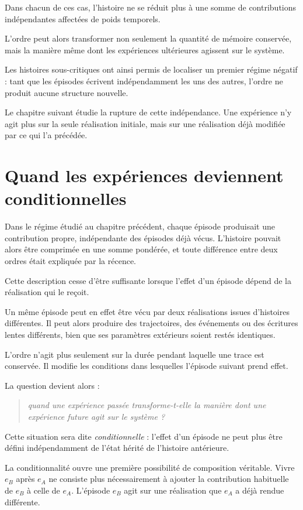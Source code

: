Dans chacun de ces cas, l'histoire ne se réduit plus à une somme de contributions indépendantes affectées de poids temporels.

L'ordre peut alors transformer non seulement la quantité de mémoire conservée, mais la manière même dont les expériences ultérieures agissent sur le système.

Les histoires sous-critiques ont ainsi permis de localiser un premier régime négatif : tant que les épisodes écrivent indépendamment les uns des autres, l'ordre ne produit aucune structure nouvelle.

Le chapitre suivant étudie la rupture de cette indépendance. Une expérience n'y agit plus sur la seule réalisation initiale, mais sur une réalisation déjà modifiée par ce qui l'a précédée.

\chapter{Quand les expériences deviennent conditionnelles}
\label{t3-experiences-conditionnelles}

Dans le régime étudié au chapitre précédent, chaque épisode produisait une contribution propre, indépendante des épisodes déjà vécus. L'histoire pouvait alors être comprimée en une somme pondérée, et toute différence entre deux ordres était expliquée par la récence.

Cette description cesse d'être suffisante lorsque l'effet d'un épisode dépend de la réalisation qui le reçoit.

Un même épisode peut en effet être vécu par deux réalisations issues d'histoires différentes. Il peut alors produire des trajectoires, des événements ou des écritures lentes différents, bien que ses paramètres extérieurs soient restés identiques.

L'ordre n'agit plus seulement sur la durée pendant laquelle une trace est conservée. Il modifie les conditions dans lesquelles l'épisode suivant prend effet.

La question devient alors :
\begin{quote}
\itshape quand une expérience passée transforme-t-elle la manière dont une expérience future agit sur le système ?
\end{quote}

Cette situation sera dite \emph{conditionnelle} : l'effet d'un épisode ne peut plus être défini indépendamment de l'état hérité de l'histoire antérieure.

La conditionnalité ouvre une première possibilité de composition véritable. Vivre $e_B$ après $e_A$ ne consiste plus nécessairement à ajouter la contribution habituelle de $e_B$ à celle de $e_A$. L'épisode $e_B$ agit sur une réalisation que $e_A$ a déjà rendue différente.


